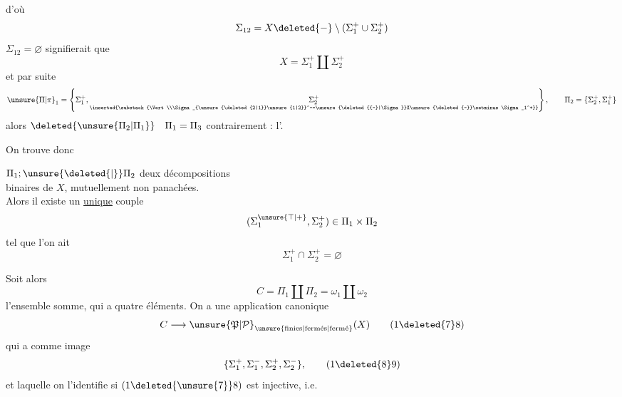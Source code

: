 d'où
\[
\Sigma_{12}=X\deleted{-}\setminus(\Sigma_1^+\cup\Sigma_2^+)
\]
 $\Sigma_{12}=\varnothing$ signifierait que
\[
X=\Sigma_1^+\amalg\Sigma_2^+
\]
et par suite
\[
\unsure{\Pi|\pi}_1=\left\{\Sigma_1^+,\underset{\inserted{\substack{\Vert\\\Sigma_{\unsure{\deleted{2|1}}\unsure{1|2}}^-=\unsure{\deleted{{-}|\Sigma}}X\unsure{\deleted{-}}\setminus\Sigma_1^+}}}{\Sigma_2^+}\right\},
\qquad\Pi_2=\{\Sigma_2^+,\Sigma_1^+\}
\]
alors $\deleted{\unsure{\Pi_2|\Pi_1}}\quad\Pi_1=\Pi_3$ contrairement : l'.

On trouve donc

\noindent{}   $\Pi_1;\unsure{\deleted{\vert}}\Pi_2$ deux décompositions\\
\makebox[0pt][r]{\rule[-2.7ex]{.4pt}{3.8ex}\hspace{.45em}}binaires de $X$, mutuellement non panachées.\\
Alors il existe un \uline{unique} couple
\[
(\Sigma_1^{\unsure{\top|+}},\Sigma_2^+)\in\Pi_1\times\Pi_2
\]
\noindent\makebox[0pt][r]{\rule[-.35ex]{.4pt}{2ex}\hspace{.45em}}tel que l'on ait
\[
\Sigma_1^+\cap\Sigma_2^+=\varnothing
\]

\begingroup\makeatletter\tagsleft@true\makeatother
Soit alors
\[
C=\Pi_1\amalg\Pi_2=\omega_1\amalg\omega_2
\tag*{(17)}
\]
l'ensemble somme, qui a quatre éléments. On a une application canonique
\[
C\longrightarrow{\unsure{\mathfrak{P}|\mathcal{P}}}_{\unsure{\text{finies}|\text{fermés}|\text{fermé}}}(X)
\tag*{(1\deleted{7}8)}
\]
qui a comme image
\[
\{\Sigma_1^+,\Sigma_1^-,\Sigma_2^+,\Sigma_2^-\},
\tag*{(1\deleted{8}9)}
\]
et laquelle on l'identifie si $(1\deleted{\unsure{7}}8)$ est injective, i.e.
\endgroup
\clearpage

